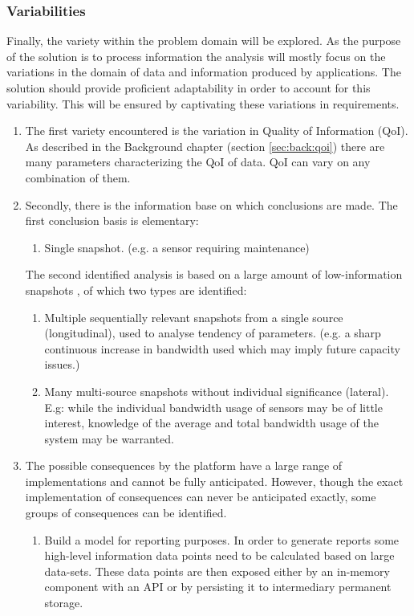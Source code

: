 \subsubsection*{Variabilities}
Finally, the variety within the problem domain will be explored. As the purpose of the solution is to process information the analysis will mostly focus on the variations in the domain of data and information produced by applications. The solution should provide proficient adaptability in order to account for this variability. This will be ensured by captivating these variations in requirements.
\begin{enumerate}[label=V\archid .\arabic*]
\nospace
\item \label{v:qoi} The first variety  encountered is the variation in Quality of Information (QoI). As described in the Background chapter (section \ref{sec:back:qoi}) there are many parameters characterizing the QoI of data. QoI can vary on any combination of them.
\item \label{v:conclusion_basis} Secondly, there is the information base on which conclusions are made. The first conclusion basis is elementary:
\begin{enumerate}
\nospace
\item Single snapshot. (e.g. a sensor requiring maintenance)
\end{enumerate}
The second identified analysis is based on a large amount of low-information snapshots \cite{qos_difficult}, of which two types are identified:
\begin{enumerate}[resume]
\item Multiple sequentially relevant snapshots from a single source (longitudinal), used to analyse tendency of parameters. (e.g. a sharp continuous increase in bandwidth used which may imply future capacity issues.)
\item Many multi-source snapshots without individual significance (lateral). E.g: while the individual bandwidth usage of sensors may be of little interest, knowledge of the average and total bandwidth usage of the system may be warranted.
\end{enumerate}
\item \label{v:consequence} The possible consequences by the platform have a large range of implementations and cannot be fully anticipated. However, though the exact implementation of consequences can never be anticipated exactly, some groups of consequences can be identified.
\begin{enumerate}
\nospace
\item Build a model for reporting purposes. In order to generate reports some high-level information data points need to be calculated based on large data-sets. These data points are then exposed either by an in-memory component with an API or by persisting it to intermediary permanent storage.

\end{enumerate}
\end{enumerate}
